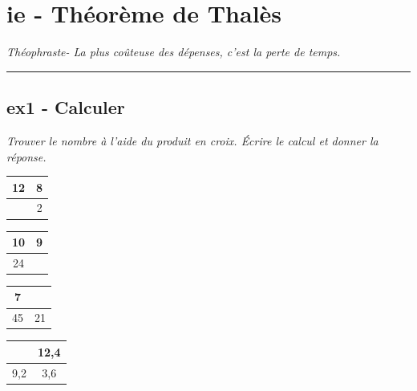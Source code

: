 \documentclass[12pt]{article}
\newcommand{\horrule}[1]{\rule{\linewidth}{#1}} %
\begin{document}

\newtheorem{Definition}{Définition}
\newtheorem{Theorem}{Théorème}
\newtheorem{Proposition}{Propriété}

\renewcommand{\labelitemi}{$\bullet$}
\renewcommand{\labelitemii}{$\circ$}

\setlength{\columnseprule}{1pt}

\section*{ie - Théorème de Thalès}
\begin{center}
  \textit{Théophraste- La plus coûteuse des dépenses, c’est la perte de temps.}
\end{center}
\horrule{2px}

\subsection*{ex1 - Calculer}
\textit{Trouver le nombre à l'aide du produit en croix. Écrire le calcul et donner la réponse.}

\begin{multicols}{4}

  \begin{center}
    \begin{tabular}{|c|c|}
      \hline
      12 & 8  \\
      \hline 
      & 2  \\
      \hline
    \end{tabular}

    \begin{tabular}{|c|c|}
      \hline
      10 & 9  \\
      \hline 
      24 &   \\
      \hline
    \end{tabular}

    \begin{tabular}{|c|c|}
      \hline
      7 &   \\
      \hline 
      45  & 21  \\
      \hline
    \end{tabular}

    \begin{tabular}{|c|c|}
      \hline
      & 12,4  \\
      \hline 
      9,2  & 3,6  \\
      \hline
    \end{tabular}
  \end{center}
\end{multicols}
\end{document}
